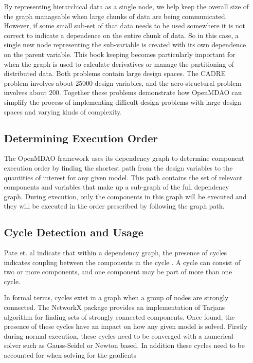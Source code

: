 \documentclass[]{aiaa-tc} %
\begin{document}
    By representing hierarchical data as a single node, we help keep the overall size of the graph manageable
    when large chunks of data are being communicated. However, if some small sub-set of that data needs to be
    used somewhere it is not correct to indicate a dependence on the entire chunk of data. So in this case, a
    single new node representing the sub-variable is created with its own dependence on the parent variable.
    This book keeping becomes particularly important for when the graph is used to calculate derivatives or
    manage the partitioning of distributed data. Both problems contain large design spaces. The CADRE problem
    involves about 25000 design variables, and the aero-structural problem involves about 200.
    Together these problems demonstrate how OpenMDAO can simplify the process of implementing difficult
    design problems with large design spaces and varying kinds of complexity.


    \subsection{Determining Execution Order}

    The OpenMDAO framework uses its dependency graph to determine component execution order by finding the
    shortest path from the design variables to the quantities of interest for any given model\cite{openmdao_derivatives}.
    This path contains the set of relevant components and variables that make up a sub-graph of the full
    dependency graph. During execution, only the components in this graph will be executed and they will be executed
    in the order prescribed by following the graph path.

    \subsection{Cycle Detection and Usage}
    Pate et. al indicate that within a dependency graph, the presence of cycles indicates coupling between
    the components in the cycle \cite{graph_problem2013}. A cycle can consist of two or more components, and
    one component may be part of more than one cycle.

    In formal terms, cycles exist in a graph when a group of nodes are strongly connected. The NetworkX package
    provides an implementation of Tarjans algorithm for finding sets of strongly connected
    components\cite{tarjan1972depth,nuutila1994finding}. Once found, the presence of these cycles
    have an impact on how any given model is solved. Firstly during normal execution, these cycles
    need to be converged with a numerical solver such as Gauss-Seidel or Newton based.
    In addition these cycles need to be accounted for when solving for the gradients
\end{document}
